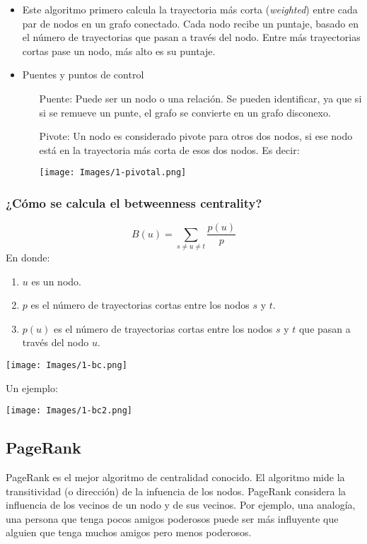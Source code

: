 \begin{itemize}
    \item Este algoritmo primero calcula la trayectoria más corta (\textit{weighted}) entre cada par de nodos en un grafo conectado. Cada nodo recibe un puntaje, basado en el número de trayectorias que pasan a través del nodo. Entre más trayectorias cortas pase un nodo, más alto es su puntaje.
    \item Puentes y puntos de control 
    \begin{itemize}
        \item[Puente:] Puede ser un nodo o una relación. Se pueden identificar, ya que si si se remueve un punte, el grafo se convierte en un grafo disconexo. 
        \item[Pivote:] Un nodo es considerado pivote para otros dos nodos, si ese nodo está en la trayectoria más corta de esos dos nodos. Es decir: 
        \begin{center}
            \texttt{[image: Images/1-pivotal.png]}
        \end{center}
    \end{itemize}
\end{itemize}
\subsubsection{¿Cómo se calcula el betweenness centrality?}

$$B(u)=\sum_{s\neq u\neq t}\frac{p(u)}{p}$$
En donde: 
\begin{enumerate}
    \item $u$ es un nodo. 
    \item $p$ es el número de trayectorias cortas entre los nodos $s$ y $t$.
    \item $p(u)$ es el número de trayectorias cortas entre los nodos $s$ y $t$ que pasan a través del nodo $u$. 
\end{enumerate}

\begin{center}
    \texttt{[image: Images/1-bc.png]}
\end{center}

Un ejemplo: 

\begin{center}
    \texttt{[image: Images/1-bc2.png]}
\end{center}

\subsection{PageRank}
PageRank es el mejor algoritmo de centralidad conocido. El algoritmo mide la transitividad (o dirección) de la infuencia de los nodos. PageRank 
considera la influencia de los vecinos de un nodo y de sus vecinos. Por ejemplo, una analogía, una persona que tenga pocos amigos poderosos puede ser más influyente que alguien que tenga muchos amigos pero menos poderosos. 

